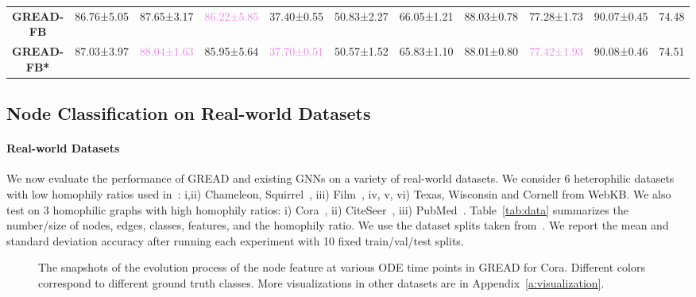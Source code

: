 \documentclass{article}
\theoremstyle{plain}
\theoremstyle{definition}
\theoremstyle{remark}
\newcommand{\std}{\scriptsize{}}
\newcommand{\THIRD}[1]{\textcolor{violet}{#1}}
\begin{document}
\begin{table*}[ht]
\begin{tabular}{c ccccccccc c}
        \textbf{GREAD-FB}   
                        & 86.76\std{±5.05} & 87.65\std{±3.17} & \THIRD{86.22\std{±5.85}} 
                        & 37.40\std{±0.55} & 50.83\std{±2.27} & 66.05\std{±1.21} 
                        & 88.03\std{±0.78} & 77.28\std{±1.73} & 90.07\std{±0.45} & 74.48\\
        \textbf{GREAD-FB*}   
                        & 87.03\std{±3.97} & \THIRD{88.04\std{±1.63}} & 85.95\std{±5.64} 
                        & \THIRD{37.70\std{±0.51}} & 50.57\std{±1.52} & 65.83\std{±1.10} 
                        & 88.01\std{±0.80} & \THIRD{77.42\std{±1.93}} &  90.08\std{±0.46} & 74.51\\
        \bottomrule
    \end{tabular}
    \label{tab:result}
\end{table*}


\subsection{Node Classification on Real-world Datasets}
\paragraph{Real-world Datasets}
We now evaluate the performance of GREAD and existing GNNs on a variety of real-world datasets. We consider 6 heterophilic datasets with low homophily ratios used in~\cite{pei2020geomGCN}: i,ii) Chameleon, Squirrel~\cite{benedek2021musae}, iii) Film~\cite{tang2009social}, iv, v, vi) Texas, Wisconsin and Cornell from WebKB. We also test on 3 homophilic graphs with high homophily ratios: i) Cora~\cite{mccallum2000automating}, ii) CiteSeer~\cite{sen2008collective}, iii) PubMed~\cite{yang2016revisiting}. Table~\ref{tab:data} summarizes the number/size of nodes, edges, classes, features, and the homophily ratio. We use the dataset splits taken from~\cite{pei2020geomGCN}. We report the mean and standard deviation accuracy after running each experiment with 10 fixed train/val/test splits.

\begin{figure}[t]
    \centering
    \caption{The snapshots of the evolution process of the node feature at various ODE time points in GREAD for Cora. Different colors correspond to different ground truth classes. More visualizations in other datasets are in Appendix~\ref{a:visualization}.}
    \label{fig:cora_tsne}
\end{figure}
\end{document}
